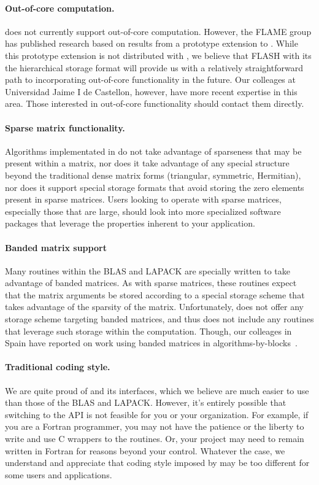 \paragraph{Out-of-core computation.}
\libflame does not currently support out-of-core computation.
However, the FLAME group has published research based on results from a
prototype extension to \libflame \cite{OOCLU:Para04}.
While this prototype extension is not distributed with \libflamens,
we believe that FLASH with its the hierarchical storage format will
provide us with a relatively straightforward path to incorporating
out-of-core functionality in the future.
Our colleages at Universidad Jaime I de Castellon, however, have more
recent expertise in this area.
Those interested in out-of-core functionality should contact them
directly.

\paragraph{Sparse matrix functionality.}
Algorithms implementated in \libflame do not take advantage of sparseness
that may be present within a matrix, nor does it take advantage of any
special structure beyond the traditional dense matrix forms (triangular,
symmetric, Hermitian), nor does it support special storage formats that
avoid storing the zero elements present in sparse matrices.
Users looking to operate with sparse matrices, especially those that are
large, should look into more specialized software packages that leverage
the properties inherent to your application.

\paragraph{Banded matrix support}
Many routines within the BLAS and LAPACK are specially written to take
advantage of banded matrices.
As with sparse matrices, these routines expect that the matrix arguments
be stored according to a special storage scheme that takes advantage of
the sparsity of the matrix.
Unfortunately, \libflame does not offer any storage scheme targeting banded
matrices, and thus does not include any routines that leverage such storage
within the computation.
Though, our colleages in Spain have reported on work using banded matrices
in algorithms-by-blocks~\cite{SuperMatrix:HPCCS}.

\paragraph{Traditional coding style.}
We are quite proud of \libflame and its interfaces, which we believe are
much easier to use than those of the BLAS and LAPACK.
However, it's entirely possible that switching to the \libflame API is
not feasible for you or your organization.
For example, if you are a Fortran programmer, you may not have the patience
or the liberty to write and use C wrappers to the \libflame routines.
Or, your project may need to remain written in Fortran for reasons beyond
your control.
Whatever the case, we understand and appreciate that coding style imposed
by \libflame may be too different for some users and applications.

